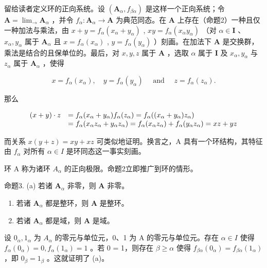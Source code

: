 留给读者定义环的正向系统。设 \((\mathbf{A}_{\alpha}, f_{\beta \alpha})\) 是这样一个正向系统；令 \(\mathbf{A} = \lim_{\longrightarrow} \mathbf{A}_{\alpha}\) ，并令 \(f_{\alpha}: \mathbf{A}_{\alpha} \to \mathbf{A}\) 为典范同态。在 \(\mathbf{A}\) 上存在（命题2）一种且仅一种加法与乘法，由 \(x + y = f_{\alpha}(x_{\alpha} + y_{\alpha})\) , \(xy = f_{\alpha}(x_{\alpha}y_{\alpha})\) （对 \(\alpha \in \mathbf{I}\) 、 \(x_{\alpha}, y_{\alpha}\) 属于 \(\mathbf{A}_{\alpha}\) 且 \(x = f_{\alpha}(x_{\alpha})\) , \(y = f_{\alpha}(y_{\alpha})\) ）刻画。在加法下 \(\mathbf{A}\) 是交换群，乘法是结合的且保单位的。最后，对 \(x, y, z\) 属于 \(\mathbf{A}\) ，选取 \(\alpha\) 属于 \(\mathbf{I}\) 及 \(x_{\alpha}, y_{\alpha}\) 与 \(z_{\alpha}\) 属于 \(\mathbf{A}_{\alpha}\) ，使得

\[
x = f _ {\alpha} (x _ {\alpha}), \quad y = f _ {\alpha} (y _ {\alpha}) \quad \text { and } \quad z = f _ {\alpha} (z _ {\alpha}).
\]

那么

\[
\begin{array}{r l} (x + y) \cdot z & = f _ {\alpha} (x _ {\alpha} + y _ {\alpha}) f _ {\alpha} (z _ {\alpha}) = f _ {\alpha} ((x _ {\alpha} + y _ {\alpha}) z _ {\alpha}) \\ & = f _ {\alpha} (x _ {\alpha} z _ {\alpha} + y _ {\alpha} z _ {\alpha}) = f _ {\alpha} (x _ {\alpha} z _ {\alpha}) + f _ {\alpha} (y _ {\alpha} z _ {\alpha}) = x z + y z \end{array}
\]

而关系 \(x(y + z) = xy + xz\) 可类似地证明。换言之，A 具有一个环结构，其特征由 \(f_{\alpha}\) 对所有 \(\alpha \in I\) 是环同态这一事实刻画。

环 A 称为诸环 \(A_{\alpha}\) 的正向极限。命题2立即推广到环的情形。

命题3. (a) 若诸 \(\mathbf{A}_{\alpha}\) 非零，则 \(\mathbf{A}\) 非零。

\begin{enumerate}
\def\labelenumi{(\alph{enumi})}
\setcounter{enumi}{1}
\item
  若诸 \(\mathbf{A}_{\alpha}\) 都是整环，则 \(\mathbf{A}\) 是整环。
\item
  若诸 \(\mathbf{A}_{\alpha}\) 都是域，则 \(\mathbf{A}\) 是域。
\end{enumerate}

设 \(0_{\alpha}, 1_{\alpha}\) 为 \(A_{\alpha}\) 的零元与单位元，0、1 为 A 的零元与单位元。存在 \(\alpha \in I\) 使得 \(f_{\alpha}(0_{\alpha}) = 0, f_{\alpha}(1_{\alpha}) = 1\) 。若 0 = 1，则存在 \(\beta \geqslant \alpha\) 使得 \(f_{\beta \alpha}(0_{\alpha}) = f_{\beta \alpha}(1_{\alpha})\) ，即 \(0_{\beta} = 1_{\beta}\) 。这就证明了 (a)。

